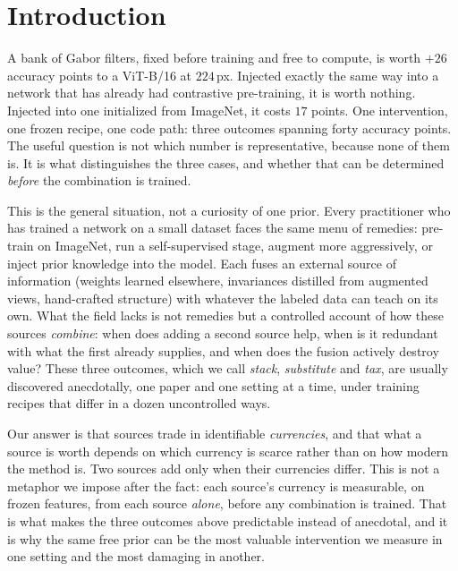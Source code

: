 \section{Introduction}\label{sec:intro}

A bank of Gabor filters, fixed before training and free to compute, is
worth $+26$ accuracy points to a ViT-B/16 at $224$\,px. Injected exactly
the same way into a network that has already had contrastive
pre-training, it is worth nothing. Injected into one initialized from
ImageNet, it costs $17$ points. One intervention, one frozen recipe, one
code path: three outcomes spanning forty accuracy points. The useful
question is not which number is representative, because none of them is.
It is what distinguishes the three cases, and whether that can be
determined \emph{before} the combination is trained.

This is the general situation, not a curiosity of one prior. Every
practitioner who has trained a network on a small dataset faces the same
menu of remedies: pre-train on ImageNet, run a self-supervised stage,
augment more aggressively, or inject prior knowledge into the model. Each
fuses an external source of information (weights learned elsewhere,
invariances distilled from augmented views, hand-crafted structure) with
whatever the labeled data can teach on its own. What the field lacks is
not remedies but a controlled account of how these sources
\emph{combine}: when does adding a second source help, when is it
redundant with what the first already supplies, and when does the fusion
actively destroy value? These three outcomes, which we call
\emph{stack}, \emph{substitute} and \emph{tax}, are usually discovered
anecdotally, one paper and one setting at a time, under training recipes that
differ in a dozen uncontrolled ways.

Our answer is that sources trade in identifiable \emph{currencies}, and
that what a source is worth depends on which currency is scarce rather
than on how modern the method is. Two sources add only when their
currencies differ. This is not a metaphor we impose after the fact: each
source's currency is measurable, on frozen features, from each source
\emph{alone}, before any combination is trained. That is what makes the
three outcomes above predictable instead of anecdotal, and it is why the
same free prior can be the most valuable intervention we measure in one
setting and the most damaging in another.

